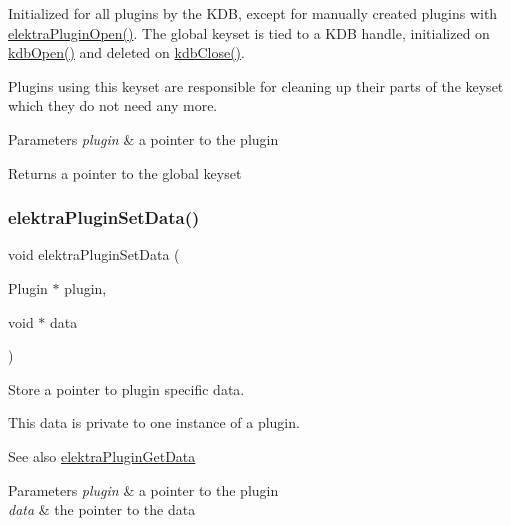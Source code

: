 Initialized for all plugins by the K\+DB, except for manually created plugins with {\ttfamily \hyperlink{elektra_2plugin_8c_a32a70a7876542c51d153164ac5108a57}{elektra\+Plugin\+Open()}}. The global keyset is tied to a K\+DB handle, initialized on {\ttfamily \hyperlink{group__kdb_ga6808defe5870f328dd17910aacbdc6ca}{kdb\+Open()}} and deleted on {\ttfamily \hyperlink{group__kdb_gadb54dc9fda17ee07deb9444df745c96f}{kdb\+Close()}}.

Plugins using this keyset are responsible for cleaning up their parts of the keyset which they do not need any more.


\begin{DoxyParams}{Parameters}
{\em plugin} & a pointer to the plugin \\
\hline
\end{DoxyParams}
\begin{DoxyReturn}{Returns}
a pointer to the global keyset 
\end{DoxyReturn}
\mbox{\label{group__plugin_gaf4b941a52ff55d0ca2a9158d90208ef2}} 
\subsubsection{\texorpdfstring{elektra\+Plugin\+Set\+Data()}{elektraPluginSetData()}}
{\footnotesize\ttfamily void elektra\+Plugin\+Set\+Data (\begin{DoxyParamCaption}\item[{Plugin $\ast$}]{plugin,  }\item[{void $\ast$}]{data }\end{DoxyParamCaption})}



Store a pointer to plugin specific data. 

This data is private to one instance of a plugin.

\begin{DoxySeeAlso}{See also}
\hyperlink{group__plugin_gaafcf3216b46292f222b8cc7828b4dd20}{elektra\+Plugin\+Get\+Data} 
\end{DoxySeeAlso}

\begin{DoxyParams}{Parameters}
{\em plugin} & a pointer to the plugin \\
\hline
{\em data} & the pointer to the data \\
\hline
\end{DoxyParams}
